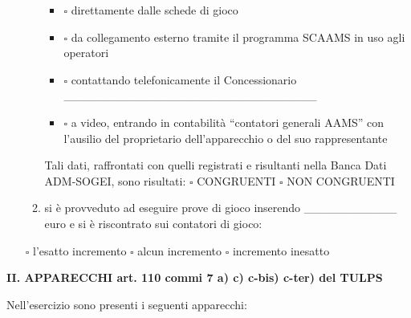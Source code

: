 \documentclass[12pt]{article}
\begin{document}
\begin{enumerate}[resume]
\begin{enumerate}
\begin{itemize}[label={}]
            \item \begin{math}\square\end{math} direttamente dalle schede di gioco
            \item \begin{math}\square\end{math} da collegamento esterno tramite il programma SCAAMS in uso agli operatori
            \item \begin{math}\square\end{math} contattando telefonicamente il Concessionario  \_\_\_\_\_\_\_\_\_\_\_\_\_\_\_\_\_\_\_\_\_\_\_\_\_\_\_\_\_\_
            \item \begin{math}\square\end{math} a video, entrando in contabilità “contatori generali AAMS” con l’ausilio del proprietario dell’apparecchio o del suo rappresentante
        \end{itemize}
        Tali dati, raffrontati con quelli registrati e risultanti nella Banca Dati ADM-SOGEI, sono risultati: \begin{math}\square\end{math} CONGRUENTI \begin{math}\square\end{math} NON CONGRUENTI
        \item si è provveduto ad eseguire prove di gioco inserendo \_\_\_\_\_\_\_\_\_\_\_ euro e si è riscontrato sui contatori di gioco:
    \end{enumerate}
    \begin{center}
        \begin{math}\square\end{math} l'esatto incremento \begin{math}\square\end{math} alcun incremento \begin{math}\square\end{math} incremento inesatto
    \end{center}
\end{enumerate}

\begin{center}
    \textbf{II.	APPARECCHI art. 110 commi 7 a) c) c-bis) c-ter) del TULPS }
\end{center}
Nell'esercizio sono presenti i seguenti apparecchi:
\end{document}

